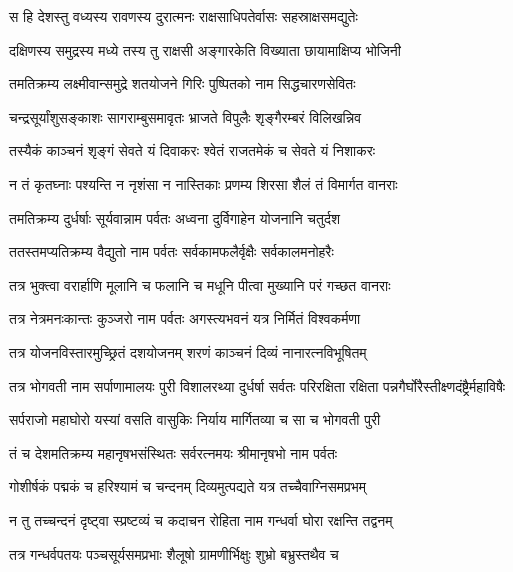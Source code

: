 \twolineshloka
{स हि देशस्तु वध्यस्य रावणस्य दुरात्मनः}
{राक्षसाधिपतेर्वासः सहस्राक्षसमद्युतेः} %

\twolineshloka
{दक्षिणस्य समुद्रस्य मध्ये तस्य तु राक्षसी}
{अङ्गारकेति विख्याता छायामाक्षिप्य भोजिनी} %

\twolineshloka
{तमतिक्रम्य लक्ष्मीवान्समुद्रे शतयोजने}
{गिरिः पुष्पितको नाम सिद्धचारणसेवितः} %

\twolineshloka
{चन्द्रसूर्यांशुसङ्काशः सागराम्बुसमावृतः}
{भ्राजते विपुलैः शृङ्गैरम्बरं विलिखन्निव} %

\twolineshloka
{तस्यैकं काञ्चनं शृङ्गं सेवते यं दिवाकरः}
{श्वेतं राजतमेकं च सेवते यं निशाकरः} %

\twolineshloka
{न तं कृतघ्नाः पश्यन्ति न नृशंसा न नास्तिकाः}
{प्रणम्य शिरसा शैलं तं विमार्गत वानराः} %

\twolineshloka
{तमतिक्रम्य दुर्धर्षाः सूर्यवान्नाम पर्वतः}
{अध्वना दुर्विगाहेन योजनानि चतुर्दश} %

\twolineshloka
{ततस्तमप्यतिक्रम्य वैद्युतो नाम पर्वतः}
{सर्वकामफलैर्वृक्षैः सर्वकालमनोहरैः} %

\twolineshloka
{तत्र भुक्त्वा वरार्हाणि मूलानि च फलानि च}
{मधूनि पीत्वा मुख्यानि परं गच्छत वानराः} %

\twolineshloka
{तत्र नेत्रमनःकान्तः कुञ्जरो नाम पर्वतः}
{अगस्त्यभवनं यत्र निर्मितं विश्वकर्मणा} %

\twolineshloka
{तत्र योजनविस्तारमुच्छ्रितं दशयोजनम्}
{शरणं काञ्चनं दिव्यं नानारत्नविभूषितम्} %

\threelineshloka
{तत्र भोगवती नाम सर्पाणामालयः पुरी}
{विशालरथ्या दुर्धर्षा सर्वतः परिरक्षिता}
{रक्षिता पन्नगैर्घोरैस्तीक्ष्णदंष्ट्रैर्महाविषैः} %

\twolineshloka
{सर्पराजो महाघोरो यस्यां वसति वासुकिः}
{निर्याय मार्गितव्या च सा च भोगवती पुरी} %

\twolineshloka
{तं च देशमतिक्रम्य महानृषभसंस्थितः}
{सर्वरत्नमयः श्रीमानृषभो नाम पर्वतः} %

\twolineshloka
{गोशीर्षकं पद्मकं च हरिश्यामं च चन्दनम्}
{दिव्यमुत्पद्यते यत्र तच्चैवाग्निसमप्रभम्} %

\twolineshloka
{न तु तच्चन्दनं दृष्ट्वा स्प्रष्टव्यं च कदाचन}
{रोहिता नाम गन्धर्वा घोरा रक्षन्ति तद्वनम्} %

\twolineshloka
{तत्र गन्धर्वपतयः पञ्चसूर्यसमप्रभाः}
{शैलूषो ग्रामणीर्भिक्षुः शुभ्रो बभ्रुस्तथैव च} %

